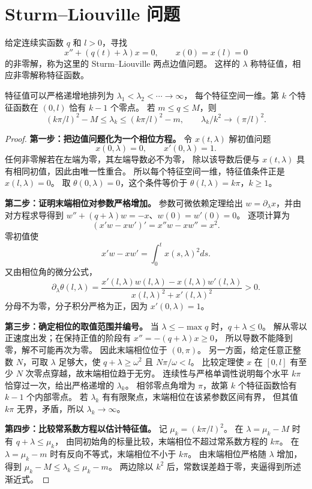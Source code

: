 \section{Sturm--Liouville 问题}
\begin{definition}
给定连续实函数 $q$ 和 $l>0$，寻找
\[
 x''+(q(t)+\lambda)x=0,\qquad x(0)=x(l)=0
\]
的非零解，称为这里的 Sturm--Liouville 两点边值问题。
这样的 $\lambda$ 称特征值，相应非零解称特征函数。
\end{definition}
\begin{theorem}
特征值可以严格递增地排列为 $\lambda_1<\lambda_2<\cdots\to\infty$，
每个特征空间一维。第 $k$ 个特征函数在 $(0,l)$ 恰有 $k-1$ 个零点。
若 $m\leq q\leq M$，则
\[
 (k\pi/l)^2-M\leq\lambda_k\leq(k\pi/l)^2-m,
 \qquad \lambda_k/k^2\to(\pi/l)^2.
\]
\end{theorem}
\begin{proof}
\textbf{第一步：把边值问题化为一个相位方程。}
令 $x(t,\lambda)$ 解初值问题
\[
 x(0,\lambda)=0,\qquad x'(0,\lambda)=1.
\]
任何非零解若在左端为零，其左端导数必不为零，
除以该导数后便与 $x(t,\lambda)$ 具有相同初值，因此由唯一性重合。
所以每个特征空间一维，特征值条件正是 $x(l,\lambda)=0$。
取 $\theta(0,\lambda)=0$，这个条件等价于 $\theta(l,\lambda)=k\pi$，$k\geq1$。

\textbf{第二步：证明末端相位对参数严格增加。}
参数可微依赖定理给出 $w=\partial_\lambda x$，并由对方程求导得到
$w''+(q+\lambda)w=-x$、$w(0)=w'(0)=0$。
逐项计算为
\[
 (x'w-xw')'=x''w-xw''=x^2.
\]
零初值使 
\[
 x'w-xw'=\displaystyle\int_0^t x(s,\lambda)^2ds.
\]
又由相位角的微分公式，
\[
 \partial_\lambda\theta(l,\lambda)
 =\frac{x'(l,\lambda)w(l,\lambda)-x(l,\lambda)w'(l,\lambda)}
 {x(l,\lambda)^2+x'(l,\lambda)^2}>0.
\]
分母不为零，分子积分严格为正，因为 $x'(0,\lambda)=1$。

\textbf{第三步：确定相位的取值范围并编号。}
当 $\lambda\leq-\max q$ 时，$q+\lambda\leq0$。
解从零以正速度出发；在保持正值的阶段有 $x''=-(q+\lambda)x\geq0$，
所以导数不能降到零，解不可能再次为零。
因此末端相位位于 $(0,\pi)$。
另一方面，给定任意正整数 $N$，可取 $\lambda$ 足够大，使
$q+\lambda\geq\omega^2$ 且 $N\pi/\omega<l$。
比较定理使 $x$ 在 $[0,l]$ 有至少 $N$ 次零点穿越，故末端相位趋于无穷。
连续性与严格单调性说明每个水平 $k\pi$ 恰穿过一次，给出严格递增的 $\lambda_k$。
相邻零点角增为 $\pi$，故第 $k$ 个特征函数恰有 $k-1$ 个内部零点。
若 $\lambda_k$ 有有限聚点，末端相位在该紧参数区间有界，
但其值 $k\pi$ 无界，矛盾，所以 $\lambda_k\to\infty$。

\textbf{第四步：比较常系数方程以估计特征值。}
记 $\mu_k=(k\pi/l)^2$。
在 $\lambda=\mu_k-M$ 时有 $q+\lambda\leq\mu_k$，
由同初始角的标量比较，末端相位不超过常系数方程的 $k\pi$。
在 $\lambda=\mu_k-m$ 时有反向不等式，末端相位不小于 $k\pi$。
由末端相位严格随 $\lambda$ 增加，得到
$\mu_k-M\leq\lambda_k\leq\mu_k-m$。
两边除以 $k^2$ 后，常数误差趋于零，夹逼得到所述渐近式。
\end{proof}

